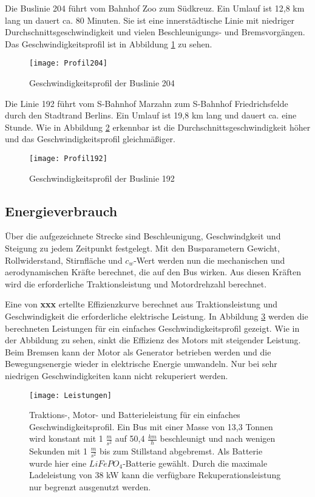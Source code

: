 Die Buslinie 204 führt vom Bahnhof Zoo zum Südkreuz. Ein Umlauf ist 12,8 km lang un dauert ca. 80 Minuten. Sie ist eine innerstädtische Linie mit niedriger Durchschnittsgeschwindigkeit und vielen Beschleunigungs- und Bremsvorgängen. Das Geschwindigkeitsprofil ist in Abbildung \ref{Abb_204} zu sehen.
\begin{figure}\centering
	\texttt{[image: Profil204]}
	\caption{Geschwindigkeitsprofil der Buslinie 204}
	\label{Abb_204}
\end{figure}

Die Linie 192 führt vom S-Bahnhof Marzahn zum S-Bahnhof Friedrichsfelde durch den Stadtrand Berlins. Ein Umlauf ist 19,8 km lang und dauert ca. eine Stunde. Wie in Abbildung \ref{Abb_192} erkennbar ist die Durchschnittsgeschwindigkeit höher und das Geschwindigkeitsprofil gleichmäßiger.

\begin{figure}\centering
	\texttt{[image: Profil192]}
	\caption{Geschwindigkeitsprofil der Buslinie 192}
	\label{Abb_192}
\end{figure}

\subsection{Energieverbrauch}
Über die aufgezeichnete Strecke sind Beschleunigung, Geschwindgkeit und Steigung zu jedem Zeitpunkt festgelegt. Mit den Busparametern Gewicht, Rollwiderstand, Stirnfläche und $c_w$-Wert werden nun die mechanischen und aerodynamischen Kräfte berechnet, die auf den Bus wirken. Aus diesen Kräften wird die erforderliche Traktionsleistung und Motordrehzahl berechnet.

Eine von \textbf{xxx} ertellte Effizienzkurve berechnet aus Traktionsleistung und Geschwindigkeit die erforderliche elektrische Leistung. In Abbildung \ref{abb_Leistungen} werden die berechneten Leistungen für ein einfaches Geschwindigkeitsprofil gezeigt. Wie in der Abbildung zu sehen, sinkt die Effizienz des Motors mit steigender Leistung. Beim Bremsen kann der Motor als Generator betrieben werden und die Bewegungsenergie wieder in elektrische Energie umwandeln. Nur bei sehr niedrigen Geschwindigkeiten kann nicht rekuperiert werden.
\begin{figure}\centering
	\texttt{[image: Leistungen]}
	\caption[Traktions-, Motor- und Batterieleistung]{Traktions-, Motor- und Batterieleistung für ein einfaches Geschwindigkeitsprofil. Ein Bus mit einer Masse von 13,3 Tonnen wird konstant mit 1 $\frac{m}{s^2}$ auf 50,4 $\frac{km}{h}$ beschleunigt und nach wenigen Sekunden mit 1 $\frac{m}{s^2}$ bis zum Stillstand abgebremst. Als Batterie wurde hier eine $LiFePO_4$-Batterie gewählt. Durch die maximale Ladeleistung von 38 kW kann die verfügbare Rekuperationsleistung nur begrenzt ausgenutzt werden.}
	\label{abb_Leistungen}
\end{figure}

